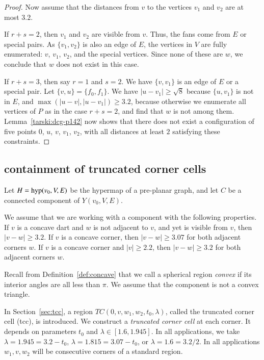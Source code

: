 \begin{proof}
Now assume that the distances from $v$ to the vertices $v_1$ and
$v_2$ are at most $3.2$.

If $r+s=2$, then $v_1$ and $v_2$ are visible from $v$. Thus, the
fans come from $E$ or special pairs.  As
$\{v_1,v_2\}$ is also an edge of $E$, the vertices in $V$ are fully
enumerated: $v$, $v_1$, $v_2$, and the special vertices.  
Since none of these are $w$, we conclude that $w$ does
not exist in this case.

If $r+s=3$, then say $r=1$ and $s=2$. We have $\{v,v_1\}$ is
an edge of $E$ or a special pair.  Let
$\{v,u\}=\{f_0,f_1\}$. We
have $|u-v_1|\ge\sqrt8$ because $\{u,v_1\}$ is not in $E$,
and $\max(|u-v|,|u-v_1|)\ge3.2$, because otherwise we enumerate
all vertices of $P$ as in the case $r+s=2$, and find that $w$ is
not among them. Lemma~\ref{tarski:dcg-p142} now shows that
there does not exist a configuration of five points
$0$, $u$, $v$, $v_1$, $v_2$, with all distances at least $2$
satisfying these constraints.
\end{proof}















\subsection{containment of truncated corner cells} %


Let $H ={\operatorname{hyp}}(v_0,V,E)$ be the hypermap of a pre-planar graph,
and let $C$ be a connected component
of $Y(v_0,V,E)$.

We assume
that we are working with a component
with the following properties. If $v$ is a concave dart and $w$
is not adjacent to $v$, and yet is visible from $v$, then
$|v-w|\ge3.2$. If $v$ is a concave corner, then $|v-w|\ge3.07$ for
both adjacent corners $w$. If $v$ is a concave corner and
$|v|\ge2.2$, then $|v-w|\ge3.2$ for both adjacent corners $w$.


Recall from Definition~\ref{def:concave} that we call a spherical
region {\it convex} if its interior angles are all less than
$\pi$. 
We assume
that the component is
not a convex triangle.

In Section~\ref{sec:tcc}, a region $TC(0,v,w_1,w_2,t_0,\lambda)$,
called the
truncated corner cell (tcc), is introduced.
We construct a {\it truncated corner cell\/} at each corner.  It depends on 
parameters $t_0$ and $\lambda \in [1.6,1.945]$. In all applications, we
take
    $\lambda = 1.945 = 3.2-t_0$, $\lambda = 1.815 = 3.07-t_0$, or
    $\lambda = 1.6 = 3.2/2$.
In all applications $w_1,v,w_2$ will be consecutive corners of
a standard region.

